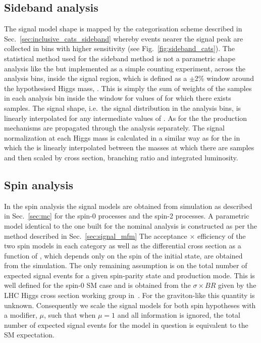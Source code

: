 \subsection{Sideband analysis}
\label{sec:sig_sideband}

The signal model shape is mapped by the categorisation scheme described in Sec.~\ref{sec:inclusive_cats_sideband} whereby events nearer the signal peak are collected in bins with higher sensitivity (see Fig.~\ref{fig:sideband_cats}). The statistical method used for the sideband method is not a parametric shape analysis like the \MFM but implemented as a simple counting experiment, across the analysis bins, inside the signal region, which is defined as a $\pm$2\% window around the hypothesised Higgs mass, \mH. This is simply the sum of weights of the \MC samples in each analysis bin inside the window for values of \mH for which there exists \MC samples. The signal shape, i.e.~the signal distribution in the analysis bins, is linearly interpolated for any intermediate values of \mH. As for the \MFM the \SM production mechanisms are propagated through the analysis separately. The signal normalization at each Higgs mass is calculated in a similar way as for the \MFM in which the \ea is linearly interpolated between the masses at which there are \MC samples and then scaled by cross section, branching ratio and integrated luminosity. 

\subsection{Spin analysis}

In the spin analysis the signal models are obtained from \MC simulation as described in Sec.~\ref{sec:mc} for the spin-0 \SM processes and the spin-2 processes. A parametric model identical to the one built for the nominal analysis is constructed as per the method described in Sec.~\ref{sec:signal_mfm}
The acceptance $\times$ efficiency of the two spin models in each category as well as the differential cross section as a function of \abscostheta, which depends only on the spin of the initial state, are obtained from the \MC simulation. The only remaining assumption is on the total number of expected signal events for a given spin-parity state and production mode. This is well defined for the spin-0 SM case and is obtained from the $\sigma\times BR$ given by the LHC Higgs cross section working group in~\cite{LHCHiggsCrossSectionWorkingGroup3}. For the graviton-like \twomp this quantity is unknown. 
Consequently we scale the signal models for both spin hypotheses with a modifier, $\mu$, such that when $\mu=1$ and all \costhetastar information is ignored, the total number of expected signal events for the model in question is equivalent to the SM expectation. 

